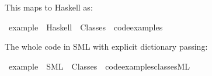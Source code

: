 \begin{isabellebody}
\begin{isamarkuptext}%
\noindent This maps to Haskell as:%
\end{isamarkuptext}%
\isamarkuptrue%
\isamarkupfalse%
\ example\ \ Haskell\ \ Classes\ \ {\isachardoublequoteopen}code{\isacharunderscore}examples{\isacharslash}{\isachardoublequoteclose}%
\begin{isamarkuptext}%

  \noindent The whole code in SML with explicit dictionary passing:%
\end{isamarkuptext}%
\isamarkuptrue%
\isamarkupfalse%
\ example\ \ SML\ \ Classes\ \ {\isachardoublequoteopen}code{\isacharunderscore}examples{\isacharslash}classes{\isachardot}ML{\isachardoublequoteclose}%
\begin{isamarkuptext}%
%
\end{isamarkuptext}%
\isamarkuptrue%
%
\isadelimtheory
%
\endisadelimtheory
%
\isatagtheory
{}\isamarkupfalse%
%
\endisatagtheory
{\isafoldtheory}%
%
\isadelimtheory
%
\endisadelimtheory
\isanewline
\end{isabellebody}%
